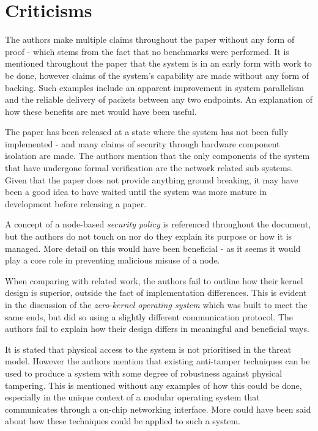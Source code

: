 \documentclass{article}
\begin{document}
\section*{Criticisms}
The authors make multiple claims throughout the paper without any form of proof - which stems from the fact that no benchmarks were performed. It is mentioned throughout the paper that the system is in an early form with work to be done, however claims of the system's capability are made without any form of backing.
Such examples include an apparent improvement in system parallelism and the reliable delivery of packets between any two endpoints. An explanation of how these benefits are met would have been useful.

The paper has been released at a state where the system has not been fully implemented - and many claims of security through hardware component isolation are made. The authors mention that the only components of the system that have undergone formal verification are the network related sub systems. Given that the paper does not provide anything ground breaking, it may have been a good idea to have waited until the system was more mature in development before releasing a paper.

A concept of a node-based \textit{security policy} is referenced throughout the document, but the authors do not touch on nor do they explain its purpose or how it is managed. More detail on this would have been beneficial - as it seems it would play a core role in preventing malicious misuse of a node.

When comparing with related work, the authors fail to outline how their kernel design is superior, outside the fact of implementation differences. This is evident in the discussion of the \textit{zero-kernel operating system} which was built to meet the same ends, but did so using a slightly different communication protocol. The authors fail to explain how their design differs in meaningful and beneficial ways.

It is stated that physical access to the system is not prioritised in the threat model. However the authors mention that existing anti-tamper techniques can be used to produce a system with some degree of robustness against physical tampering. This is mentioned without any examples of how this could be done, especially in the unique context of a modular operating system that communicates through a on-chip networking interface. More could have been said about how these techniques could be applied to such a system.


\nocite{*}


\end{document}
